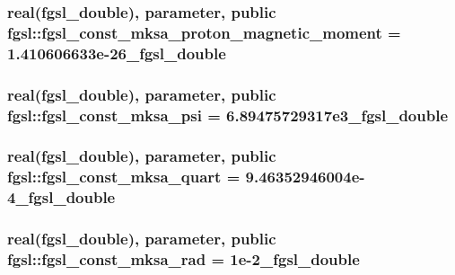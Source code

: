 \subsubsection[{fgsl\+\_\+const\+\_\+mksa\+\_\+proton\+\_\+magnetic\+\_\+moment}]{\setlength{\rightskip}{0pt plus 5cm}real({\bf fgsl\+\_\+double}), parameter, public fgsl\+::fgsl\+\_\+const\+\_\+mksa\+\_\+proton\+\_\+magnetic\+\_\+moment = 1.\+410606633e-\/26\+\_\+fgsl\+\_\+double}\label{namespacefgsl_a11b01d727e4e01028200e21ced0e16c2}
\hypertarget{namespacefgsl_af1bb05c944f3cc7eca8c2ffb562c1cfe}{}
\subsubsection[{fgsl\+\_\+const\+\_\+mksa\+\_\+psi}]{\setlength{\rightskip}{0pt plus 5cm}real({\bf fgsl\+\_\+double}), parameter, public fgsl\+::fgsl\+\_\+const\+\_\+mksa\+\_\+psi = 6.\+89475729317e3\+\_\+fgsl\+\_\+double}\label{namespacefgsl_af1bb05c944f3cc7eca8c2ffb562c1cfe}
\hypertarget{namespacefgsl_a30b92280c9a587dcda6d603b6c737fc3}{}
\subsubsection[{fgsl\+\_\+const\+\_\+mksa\+\_\+quart}]{\setlength{\rightskip}{0pt plus 5cm}real({\bf fgsl\+\_\+double}), parameter, public fgsl\+::fgsl\+\_\+const\+\_\+mksa\+\_\+quart = 9.\+46352946004e-\/4\+\_\+fgsl\+\_\+double}\label{namespacefgsl_a30b92280c9a587dcda6d603b6c737fc3}
\hypertarget{namespacefgsl_a46fbda29caeb0f9c75253f461d340353}{}
\subsubsection[{fgsl\+\_\+const\+\_\+mksa\+\_\+rad}]{\setlength{\rightskip}{0pt plus 5cm}real({\bf fgsl\+\_\+double}), parameter, public fgsl\+::fgsl\+\_\+const\+\_\+mksa\+\_\+rad = 1e-\/2\+\_\+fgsl\+\_\+double}\label{namespacefgsl_a46fbda29caeb0f9c75253f461d340353}
\hypertarget{namespacefgsl_a0b3f21e2d3493c6d7662dbe77ab1fbe6}{}
